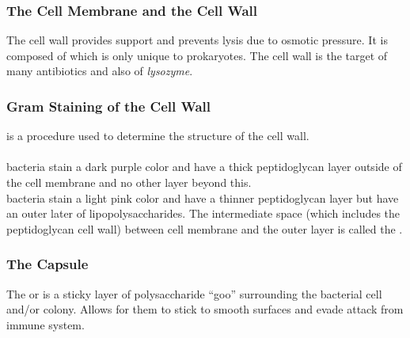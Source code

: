 \documentclass[../Bio_chemistryReview.tex]{subfiles}
\begin{document}
\subsubsection{The Cell Membrane and the Cell Wall}
The cell wall provides support and prevents lysis due to osmotic pressure. It is
composed of  which is only unique to prokaryotes. The
cell wall is the target of many antibiotics and also of \textit{lysozyme}.

\subsubsection{Gram Staining of the Cell Wall}
 is a procedure used to determine the structure of the
cell wall.\\ 
\hfil\\
 bacteria stain a dark purple
color and have a thick peptidoglycan layer outside of the cell membrane and no
other layer beyond this.\\
 bacteria stain a
light pink color and have a thinner peptidoglycan layer but have an outer later
of lipopolysaccharides. The intermediate space (which includes the peptidoglycan
cell wall) between cell membrane and the outer layer is called the
.

\subsubsection{The Capsule}
The  or  is a sticky layer of
polysaccharide ``goo'' surrounding the bacterial cell and/or colony. Allows for
them to stick to smooth surfaces and evade attack from immune system.
\end{document}

